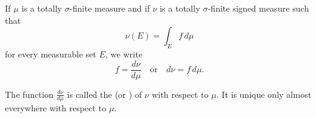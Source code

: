 If $\mu$ is a totally $\sigma$-finite measure and if $\nu$ is a totally $\sigma$-finite signed measure such that
$$\nu(E) = \int_E f \, d\mu$$
for every measurable set $E$, we write
$$f = \frac{d\nu}{d\mu} \quad \text{or} \quad d\nu = f \, d\mu.$$

The function $\frac{d\nu}{d\mu}$ is called the  (or ) of $\nu$ with respect to $\mu$. It is unique only almost everywhere with respect to $\mu$.
